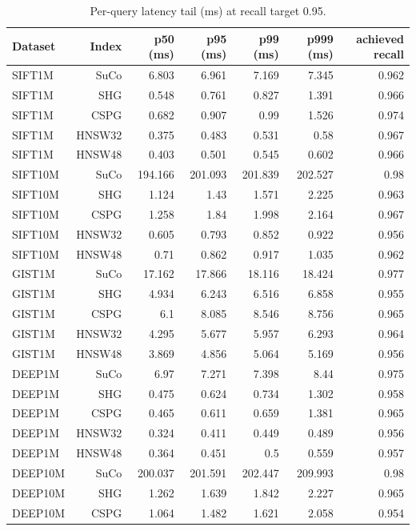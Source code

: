 \begin{table}[t]
\centering
\small
\caption{Per-query latency tail (ms) at recall target 0.95.}
\label{tab:latency-tail-r95}
\begin{tabular}{lrrrrrr}
\toprule
Dataset & Index & p50 (ms) & p95 (ms) & p99 (ms) & p999 (ms) & achieved recall \\
\midrule
SIFT1M & SuCo & 6.803 & 6.961 & 7.169 & 7.345 & 0.962 \\
SIFT1M & SHG & 0.548 & 0.761 & 0.827 & 1.391 & 0.966 \\
SIFT1M & CSPG & 0.682 & 0.907 & 0.99 & 1.526 & 0.974 \\
SIFT1M & HNSW32 & 0.375 & 0.483 & 0.531 & 0.58 & 0.967 \\
SIFT1M & HNSW48 & 0.403 & 0.501 & 0.545 & 0.602 & 0.966 \\
SIFT10M & SuCo & 194.166 & 201.093 & 201.839 & 202.527 & 0.98 \\
SIFT10M & SHG & 1.124 & 1.43 & 1.571 & 2.225 & 0.963 \\
SIFT10M & CSPG & 1.258 & 1.84 & 1.998 & 2.164 & 0.967 \\
SIFT10M & HNSW32 & 0.605 & 0.793 & 0.852 & 0.922 & 0.956 \\
SIFT10M & HNSW48 & 0.71 & 0.862 & 0.917 & 1.035 & 0.962 \\
GIST1M & SuCo & 17.162 & 17.866 & 18.116 & 18.424 & 0.977 \\
GIST1M & SHG & 4.934 & 6.243 & 6.516 & 6.858 & 0.955 \\
GIST1M & CSPG & 6.1 & 8.085 & 8.546 & 8.756 & 0.965 \\
GIST1M & HNSW32 & 4.295 & 5.677 & 5.957 & 6.293 & 0.964 \\
GIST1M & HNSW48 & 3.869 & 4.856 & 5.064 & 5.169 & 0.956 \\
DEEP1M & SuCo & 6.97 & 7.271 & 7.398 & 8.44 & 0.975 \\
DEEP1M & SHG & 0.475 & 0.624 & 0.734 & 1.302 & 0.958 \\
DEEP1M & CSPG & 0.465 & 0.611 & 0.659 & 1.381 & 0.965 \\
DEEP1M & HNSW32 & 0.324 & 0.411 & 0.449 & 0.489 & 0.956 \\
DEEP1M & HNSW48 & 0.364 & 0.451 & 0.5 & 0.559 & 0.957 \\
DEEP10M & SuCo & 200.037 & 201.591 & 202.447 & 209.993 & 0.98 \\
DEEP10M & SHG & 1.262 & 1.639 & 1.842 & 2.227 & 0.965 \\
DEEP10M & CSPG & 1.064 & 1.482 & 1.621 & 2.058 & 0.954 \\

\end{tabular}
\end{table}
